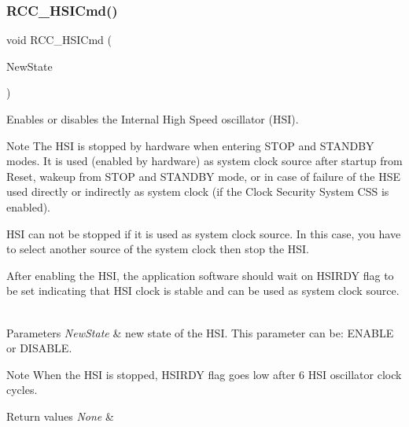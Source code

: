 \subsubsection{\texorpdfstring{R\+C\+C\+\_\+\+H\+S\+I\+Cmd()}{RCC\_HSICmd()}}
{\footnotesize\ttfamily void R\+C\+C\+\_\+\+H\+S\+I\+Cmd (\begin{DoxyParamCaption}\item[{Functional\+State}]{New\+State }\end{DoxyParamCaption})}



Enables or disables the Internal High Speed oscillator (H\+SI). 

\begin{DoxyNote}{Note}
The H\+SI is stopped by hardware when entering S\+T\+OP and S\+T\+A\+N\+D\+BY modes. It is used (enabled by hardware) as system clock source after startup from Reset, wakeup from S\+T\+OP and S\+T\+A\+N\+D\+BY mode, or in case of failure of the H\+SE used directly or indirectly as system clock (if the Clock Security System C\+SS is enabled). ~\newline


H\+SI can not be stopped if it is used as system clock source. In this case, you have to select another source of the system clock then stop the H\+SI. ~\newline


After enabling the H\+SI, the application software should wait on H\+S\+I\+R\+DY flag to be set indicating that H\+SI clock is stable and can be used as system clock source. ~\newline

\end{DoxyNote}

\begin{DoxyParams}{Parameters}
{\em New\+State} & new state of the H\+SI. This parameter can be\+: E\+N\+A\+B\+LE or D\+I\+S\+A\+B\+LE. \\
\hline
\end{DoxyParams}
\begin{DoxyNote}{Note}
When the H\+SI is stopped, H\+S\+I\+R\+DY flag goes low after 6 H\+SI oscillator clock cycles. ~\newline

\end{DoxyNote}

\begin{DoxyRetVals}{Return values}
{\em None} & \\
\hline
\end{DoxyRetVals}
\mbox{\label{group___r_c_c___group1_ga65209ab5c3589b249c7d70f978735ca6}} 
